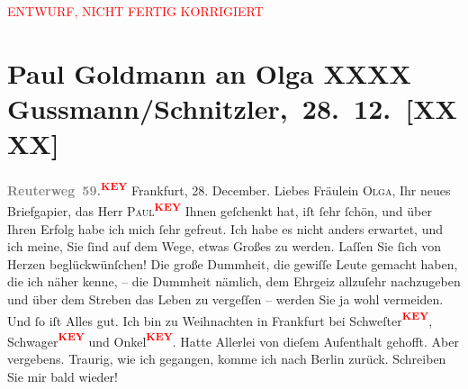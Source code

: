 
\begin{center}
            \textcolor{red}{ENTWURF, NICHT FERTIG KORRIGIERT}
                      \end{center}
            
         
         \renewcommand{\erwaehntePersonen}{Personen: Peter Altenberg, Olga Schnitzler}
         \renewcommand{\erwaehnteOrte}{Orte: Berlin, Frankfurt am Main, Wien}
         \renewcommand{\erwaehnteWerke}{}
               \section[ Paul Goldmann an Olga XXXX Gussmann/Schnitzler, 28. 12. {[}XXXX{]}]{ Paul Goldmann an Olga XXXX Gussmann/Schnitzler, 28. 12. {[}XXXX{]}}\nopagebreak{}\rehead{ }\begin{ledgroupsized}[t]{13cm}\normalsize\beginnumbering \toendnotes[C]{\smallbreak\pagebreak[2]} 
\toendnotes[C]{\smallbreak}\pstart
           \noindent{}{\pb}\pend
           \textcolor{gray}{\textbf{Reuterweg 59.}}\textcolor{red}{\textsuperscript{\textbf{KEY}}}\pstart
           Frankfurt, 28.
                  December.\pend
           \pstart{}Liebes Fräulein \textsc{Olga},\pend\pstart
           Ihr neues Briefgapier, das Herr \textsc{Paul\textcolor{red}{\textsuperscript{\textbf{KEY}}}} Ihnen geſchenkt hat, iſt ſehr ſchön, und über Ihren Erfolg habe ich mich ſehr
               gefreut. Ich habe es nicht anders erwartet, und ich meine, Sie ſind auf dem Wege,
               etwas Großes zu werden. Laſſen Sie ſich von Herzen beglückwünſchen! Die große
               Dummheit, die gewiſſe Leute gemacht haben, die ich näher kenne, – die Dummheit
               nämlich, dem Ehrgeiz allzuſehr nachzugeben und über dem Streben das Leben zu
               vergeſſen – werden Sie ja wohl vermeiden. Und ſo iſt Alles gut. Ich bin zu
                  Weihnachten in Frankfurt bei Schweſter\textcolor{red}{\textsuperscript{\textbf{KEY}}}, Schwager\textcolor{red}{\textsuperscript{\textbf{KEY}}}{\pb} und Onkel\textcolor{red}{\textsuperscript{\textbf{KEY}}}. Hatte Allerlei von dieſem Aufenthalt gehofft.
               Aber vergebens. Traurig, wie ich gegangen, komme ich nach Berlin zurück. Schreiben Sie mir bald wieder!

\end{ledgroupsized}
